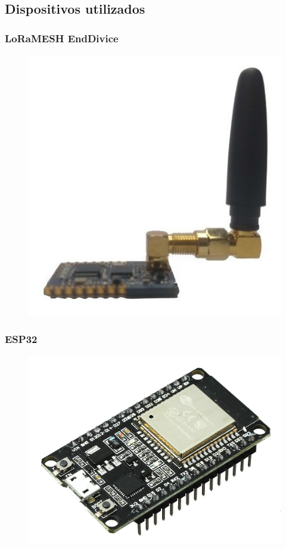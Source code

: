 \documentclass[12pt]{beamer}
\begin{document}
\subsection{Dispositivos utilizados}
\begin{frame}
    \frametitle{LoRaMESH EndDivice}
    \begin{figure}[!h]
        \centering
        \includegraphics[width=.60\textwidth]{lora}
    \end{figure}
\end{frame}

\begin{frame}
    \frametitle{ESP32}
    \begin{figure}[!h]
        \centering
        \includegraphics[width=.70\textwidth]{esp}
    \end{figure}
\end{frame}
\end{document}
